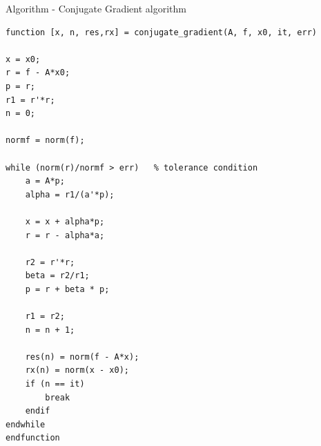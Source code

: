 \documentclass[eng,openany]{mgr}
\begin{document}
Algorithm - Conjugate Gradient algorithm\\
\begin{lstlisting}
function [x, n, res,rx] = conjugate_gradient(A, f, x0, it, err)

x = x0;        
r = f - A*x0; 
p = r;         
r1 = r'*r;
n = 0;  

normf = norm(f);

while (norm(r)/normf > err)   % tolerance condition
	a = A*p;
	alpha = r1/(a'*p);   
	       
	x = x + alpha*p;            
	r = r - alpha*a;   
	       
	r2 = r'*r;                  
	beta = r2/r1;               
	p = r + beta * p;    

	r1 = r2;
	n = n + 1;
	
	res(n) = norm(f - A*x); 
	rx(n) = norm(x - x0);
	if (n == it)         
		break
	endif
endwhile
endfunction

\end{lstlisting}
\end{document}
